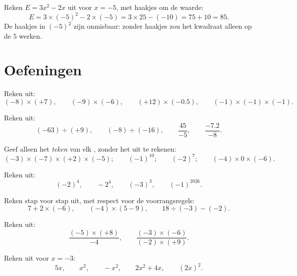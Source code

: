 \begin{example}\label{ex:g8:negprod:substitute}
Reken $E = 3x^2 - 2x$ uit voor $x = -5$, met haakjes om de waarde:
\[
E = 3 \times (-5)^2 - 2 \times (-5)
= 3 \times 25 - (-10)
= 75 + 10 = 85 .
\]
De haakjes in $(-5)^2$ zijn onmisbaar: zonder haakjes zou het kwadraat alleen op de
$5$ werken.
\end{example}

\section{Oefeningen}

\begin{exercise}[$\star$]\label{exo:g8:negprod:1}
Reken uit:
\[
(-8) \times (+7), \qquad
(-9) \times (-6), \qquad
(+12) \times (-0.5), \qquad
(-1) \times (-1) \times (-1).
\]
\end{exercise}

\begin{exercise}[$\star$]\label{exo:g8:negprod:2}
Reken uit:
\[
(-63) \div (+9), \qquad
(-8) \div (-16), \qquad
\frac{45}{-5}, \qquad
\frac{-7.2}{-8} .
\]
\end{exercise}

\begin{exercise}[$\star$]\label{exo:g8:negprod:3}
Geef alleen het \emph{teken} van elk , zonder het uit te rekenen:
\[
(-3) \times (-7) \times (+2) \times (-5); \qquad
(-1)^{10}; \qquad
(-2)^{7}; \qquad
(-4) \times 0 \times (-6).
\]
\end{exercise}

\begin{exercise}[$\star$]\label{exo:g8:negprod:4}
Reken uit:
\[
(-2)^4, \qquad
-2^4, \qquad
(-3)^3, \qquad
(-1)^{2026} .
\]
\end{exercise}

\begin{exercise}[$\star$]\label{exo:g8:negprod:5}
Reken stap voor stap uit, met respect voor de voorrangsregels:
\[
7 + 2 \times (-6), \qquad
(-4) \times (5 - 9), \qquad
18 \div (-3) - (-2) .
\]
\end{exercise}

\begin{exercise}[$\star$]\label{exo:g8:negprod:6}
Reken uit:
\[
\frac{(-5) \times (+8)}{-4}, \qquad
\frac{(-3) \times (-6)}{(-2) \times (+9)} .
\]
\end{exercise}

\begin{exercise}[$\star$]\label{exo:g8:negprod:7}
Reken uit voor $x = -3$:
\[
5x, \qquad x^2, \qquad -x^2, \qquad 2x^2 + 4x, \qquad (2x)^2 .
\]
\end{exercise}

